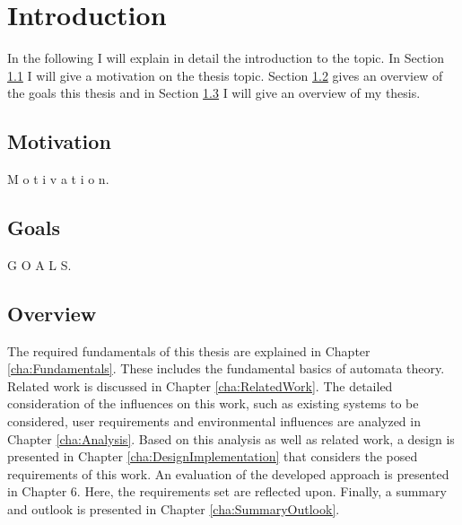 \chapter{Introduction}
\label{cha:Introduction}

In the following I will explain in detail the introduction to the topic. In Section \ref{sec:Motivation} I will give a motivation on the thesis topic. Section \ref{sec:Goals} gives an overview of the goals this thesis and in Section \ref{sec:Overview} I will give an overview of my thesis. 

\section{Motivation}
\label{sec:Motivation}
M o t i v a t i o n. 

\section{Goals}
\label{sec:Goals}
G O A L S.

\section{Overview}
\label{sec:Overview}
The required fundamentals of this thesis are explained in Chapter \ref{cha:Fundamentals}. These includes the fundamental basics of automata theory. Related work is discussed in Chapter \ref{cha:RelatedWork}. The detailed consideration of the influences on this work, such as existing systems to be considered, user requirements and environmental influences are analyzed in Chapter \ref{cha:Analysis}. Based on this analysis as well as related work, a design is presented in Chapter \ref{cha:DesignImplementation} that considers the posed requirements of this work.  An evaluation of the developed approach is presented in Chapter 6. Here, the requirements set are reflected upon. Finally, a summary and outlook is presented in Chapter \ref{cha:SummaryOutlook}.  


